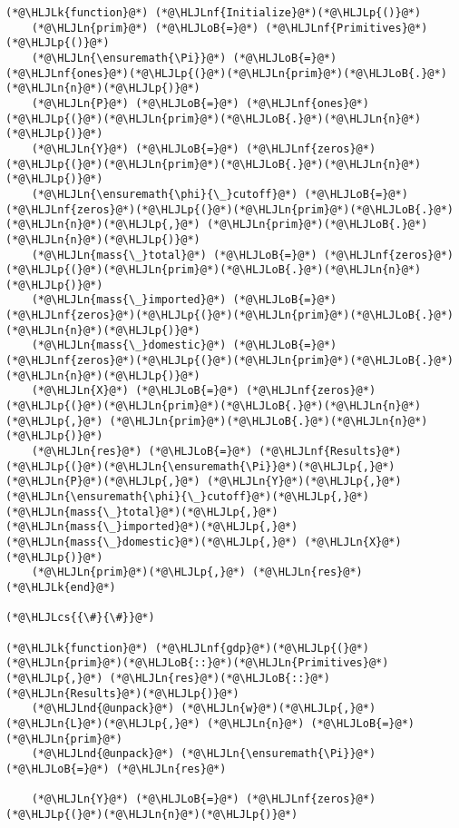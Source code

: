 \documentclass[12pt,a4paper]{article}
\newcommand{\HLJLk}[1]{\textcolor[RGB]{148,91,176}{\textbf{#1}}}
\newcommand{\HLJLn}[1]{#1}
\newcommand{\HLJLnd}[1]{\textcolor[RGB]{214,102,97}{#1}}
\newcommand{\HLJLnf}[1]{\textcolor[RGB]{66,102,213}{#1}}
\newcommand{\HLJLoB}[1]{\textcolor[RGB]{102,102,102}{\textbf{#1}}}
\newcommand{\HLJLp}[1]{#1}
\newcommand{\HLJLcs}[1]{\textcolor[RGB]{153,153,119}{\textit{#1}}}
\begin{document}
\begin{lstlisting}
(*@\HLJLk{function}@*) (*@\HLJLnf{Initialize}@*)(*@\HLJLp{()}@*)
    (*@\HLJLn{prim}@*) (*@\HLJLoB{=}@*) (*@\HLJLnf{Primitives}@*)(*@\HLJLp{()}@*)
    (*@\HLJLn{\ensuremath{\Pi}}@*) (*@\HLJLoB{=}@*) (*@\HLJLnf{ones}@*)(*@\HLJLp{(}@*)(*@\HLJLn{prim}@*)(*@\HLJLoB{.}@*)(*@\HLJLn{n}@*)(*@\HLJLp{)}@*)
    (*@\HLJLn{P}@*) (*@\HLJLoB{=}@*) (*@\HLJLnf{ones}@*)(*@\HLJLp{(}@*)(*@\HLJLn{prim}@*)(*@\HLJLoB{.}@*)(*@\HLJLn{n}@*)(*@\HLJLp{)}@*)
    (*@\HLJLn{Y}@*) (*@\HLJLoB{=}@*) (*@\HLJLnf{zeros}@*)(*@\HLJLp{(}@*)(*@\HLJLn{prim}@*)(*@\HLJLoB{.}@*)(*@\HLJLn{n}@*)(*@\HLJLp{)}@*)
    (*@\HLJLn{\ensuremath{\phi}{\_}cutoff}@*) (*@\HLJLoB{=}@*) (*@\HLJLnf{zeros}@*)(*@\HLJLp{(}@*)(*@\HLJLn{prim}@*)(*@\HLJLoB{.}@*)(*@\HLJLn{n}@*)(*@\HLJLp{,}@*) (*@\HLJLn{prim}@*)(*@\HLJLoB{.}@*)(*@\HLJLn{n}@*)(*@\HLJLp{)}@*)
    (*@\HLJLn{mass{\_}total}@*) (*@\HLJLoB{=}@*) (*@\HLJLnf{zeros}@*)(*@\HLJLp{(}@*)(*@\HLJLn{prim}@*)(*@\HLJLoB{.}@*)(*@\HLJLn{n}@*)(*@\HLJLp{)}@*)
    (*@\HLJLn{mass{\_}imported}@*) (*@\HLJLoB{=}@*) (*@\HLJLnf{zeros}@*)(*@\HLJLp{(}@*)(*@\HLJLn{prim}@*)(*@\HLJLoB{.}@*)(*@\HLJLn{n}@*)(*@\HLJLp{)}@*)
    (*@\HLJLn{mass{\_}domestic}@*) (*@\HLJLoB{=}@*) (*@\HLJLnf{zeros}@*)(*@\HLJLp{(}@*)(*@\HLJLn{prim}@*)(*@\HLJLoB{.}@*)(*@\HLJLn{n}@*)(*@\HLJLp{)}@*)
    (*@\HLJLn{X}@*) (*@\HLJLoB{=}@*) (*@\HLJLnf{zeros}@*)(*@\HLJLp{(}@*)(*@\HLJLn{prim}@*)(*@\HLJLoB{.}@*)(*@\HLJLn{n}@*)(*@\HLJLp{,}@*) (*@\HLJLn{prim}@*)(*@\HLJLoB{.}@*)(*@\HLJLn{n}@*)(*@\HLJLp{)}@*)
    (*@\HLJLn{res}@*) (*@\HLJLoB{=}@*) (*@\HLJLnf{Results}@*)(*@\HLJLp{(}@*)(*@\HLJLn{\ensuremath{\Pi}}@*)(*@\HLJLp{,}@*) (*@\HLJLn{P}@*)(*@\HLJLp{,}@*) (*@\HLJLn{Y}@*)(*@\HLJLp{,}@*) (*@\HLJLn{\ensuremath{\phi}{\_}cutoff}@*)(*@\HLJLp{,}@*) (*@\HLJLn{mass{\_}total}@*)(*@\HLJLp{,}@*) (*@\HLJLn{mass{\_}imported}@*)(*@\HLJLp{,}@*) (*@\HLJLn{mass{\_}domestic}@*)(*@\HLJLp{,}@*) (*@\HLJLn{X}@*)(*@\HLJLp{)}@*)
    (*@\HLJLn{prim}@*)(*@\HLJLp{,}@*) (*@\HLJLn{res}@*)
(*@\HLJLk{end}@*)

(*@\HLJLcs{{\#}{\#}}@*)

(*@\HLJLk{function}@*) (*@\HLJLnf{gdp}@*)(*@\HLJLp{(}@*)(*@\HLJLn{prim}@*)(*@\HLJLoB{::}@*)(*@\HLJLn{Primitives}@*)(*@\HLJLp{,}@*) (*@\HLJLn{res}@*)(*@\HLJLoB{::}@*)(*@\HLJLn{Results}@*)(*@\HLJLp{)}@*)
    (*@\HLJLnd{@unpack}@*) (*@\HLJLn{w}@*)(*@\HLJLp{,}@*) (*@\HLJLn{L}@*)(*@\HLJLp{,}@*) (*@\HLJLn{n}@*) (*@\HLJLoB{=}@*) (*@\HLJLn{prim}@*)
    (*@\HLJLnd{@unpack}@*) (*@\HLJLn{\ensuremath{\Pi}}@*) (*@\HLJLoB{=}@*) (*@\HLJLn{res}@*)

    (*@\HLJLn{Y}@*) (*@\HLJLoB{=}@*) (*@\HLJLnf{zeros}@*)(*@\HLJLp{(}@*)(*@\HLJLn{n}@*)(*@\HLJLp{)}@*)


\end{lstlisting}
\end{document}
